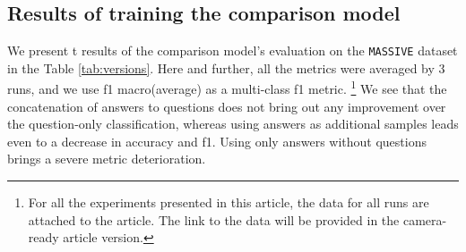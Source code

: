 \subsection{Results of training the comparison model} 
We present t results of the comparison model's evaluation on the \texttt{MASSIVE} dataset in the Table \ref{tab:versions}. Here and further, all the metrics were averaged by 3 runs, and we use f1 macro(average) as a multi-class f1 metric. 
\footnote{For all the experiments presented in this article, the data for all runs are attached to the article. The link to the data will be provided in the camera-ready article version.} 
We see that the concatenation of answers to questions does not bring out any improvement over the question-only classification, whereas using answers as additional samples leads even to a decrease in accuracy and f1. Using only answers without questions brings a severe metric deterioration. 

\begin{table*}
\centering
\caption{Accuracy(f1) on the Russian \texttt{MASSIVE} for different versions of \texttt{YAQTopics}. \textbf{Q} means questions, \textbf{A} means answers, \textbf{Q and A} means treating questions and answers as separate examples, and \textbf{Q [SEP] A} means concatenation  of every questions with the corresponding answer(if that answer exist) using [SEP] token. Averaged by three runs. Backbone: \textit{bert-base-multilingual-cased}. Total score for majority baseline: accuracy 22.9, f1 6.2}
\end{table*}



